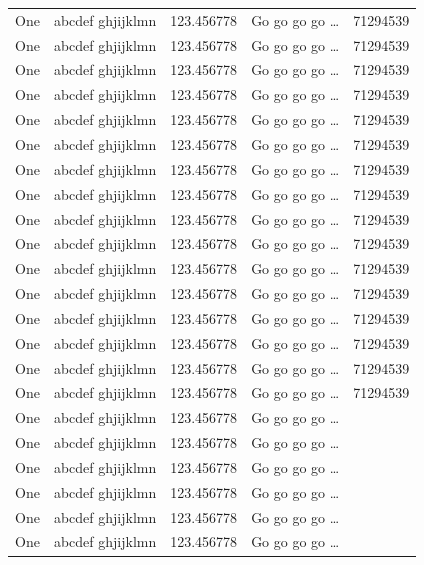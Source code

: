 \documentclass[phd,showframe]{ndsu-thesis-2022}
\begin{document}
\begin{spacing}{0.84}
\begin{xltabular}{\textwidth}{l >{\raggedright\arraybackslash}p{0.3\textwidth} X l  >{\raggedleft\arraybackslash}X @{}}
One & abcdef ghjijklmn & 123.456778  & Go go go go \ldots & \num{71294539}\\
One & abcdef ghjijklmn & 123.456778  & Go go go go \ldots & \num{71294539}\\
One & abcdef ghjijklmn & 123.456778  & Go go go go \ldots & \num{71294539}\\
One & abcdef ghjijklmn & 123.456778  & Go go go go \ldots & \num{71294539}\\
One & abcdef ghjijklmn & 123.456778  & Go go go go \ldots & \num{71294539}\\
One & abcdef ghjijklmn & 123.456778  & Go go go go \ldots & \num{71294539}\\
One & abcdef ghjijklmn & 123.456778  & Go go go go \ldots & \num{71294539}\\
One & abcdef ghjijklmn & 123.456778  & Go go go go \ldots & \num{71294539}\\
One & abcdef ghjijklmn & 123.456778  & Go go go go \ldots & \num{71294539}\\
One & abcdef ghjijklmn & 123.456778  & Go go go go \ldots & \num{71294539}\\
One & abcdef ghjijklmn & 123.456778  & Go go go go \ldots & \num{71294539}\\
One & abcdef ghjijklmn & 123.456778  & Go go go go \ldots & \num{71294539}\\
One & abcdef ghjijklmn & 123.456778  & Go go go go \ldots & \num{71294539}\\
One & abcdef ghjijklmn & 123.456778  & Go go go go \ldots & \num{71294539}\\
One & abcdef ghjijklmn & 123.456778  & Go go go go \ldots & \num{71294539}\\
One & abcdef ghjijklmn & 123.456778  & Go go go go \ldots & \num{71294539}\\
One & abcdef ghjijklmn & 123.456778  & Go go go go \ldots \\
One & abcdef ghjijklmn & 123.456778  & Go go go go \ldots \\
One & abcdef ghjijklmn & 123.456778  & Go go go go \ldots \\
One & abcdef ghjijklmn & 123.456778  & Go go go go \ldots \\
One & abcdef ghjijklmn & 123.456778  & Go go go go \ldots \\
One & abcdef ghjijklmn & 123.456778  & Go go go go \ldots \\

\end{xltabular}
\end{spacing}
\end{document}
